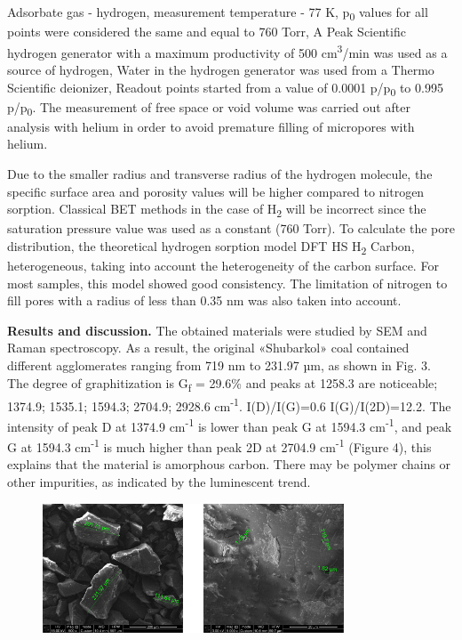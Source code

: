 Adsorbate gas - hydrogen, measurement temperature - 77 K,
p\textsubscript{0} values \hspace{0pt}\hspace{0pt}for all points were
considered the same and equal to 760 Torr, A Peak Scientific hydrogen
generator with a maximum productivity of 500 cm\textsuperscript{3}/min
was used as a source of hydrogen, Water in the hydrogen generator was
used from a Thermo Scientific deionizer, Readout points started from a
value of 0.0001 p/p\textsubscript{0} to 0.995 p/p\textsubscript{0}. The
measurement of free space or void volume was carried out after analysis
with helium in order to avoid premature filling of micropores with
helium.

Due to the smaller radius and transverse radius of the hydrogen
molecule, the specific surface area and porosity values
\hspace{0pt}\hspace{0pt}will be higher compared to nitrogen sorption.
Classical BET methods in the case of H\textsubscript{2} will be
incorrect since the saturation pressure value was used as a constant
(760 Torr). To calculate the pore distribution, the theoretical hydrogen
sorption model DFT HS H\textsubscript{2} Carbon, heterogeneous, taking
into account the heterogeneity of the carbon surface. For most samples,
this model showed good consistency. The limitation of nitrogen to fill
pores with a radius of less than 0.35 nm was also taken into account.

{\bfseries Results and discussion.} The obtained materials were studied by
SEM and Raman spectroscopy. As a result, the original «Shubarkol» coal
contained different agglomerates ranging from 719 nm to 231.97 µm, as
shown in Fig. 3. The degree of graphitization is G\textsubscript{f} =
29.6\% and peaks at 1258.3 are noticeable; 1374.9; 1535.1; 1594.3;
2704.9; 2928.6 cm\textsuperscript{-1}. I(D)/I(G)=0.6 I(G)/I(2D)=12.2.
The intensity of peak D at 1374.9 cm\textsuperscript{-1} is lower than
peak G at 1594.3 cm\textsuperscript{-1}, and peak G at 1594.3
cm\textsuperscript{-1} is much higher than peak 2D at 2704.9
cm\textsuperscript{-1} (Figure 4), this explains that the material is
amorphous carbon. There may be polymer chains or other impurities, as
indicated by the luminescent trend.

\begin{figure}[H]
	\centering
	\includegraphics[width=0.8\textwidth]{assets/55}
	\caption*{}
\end{figure}

